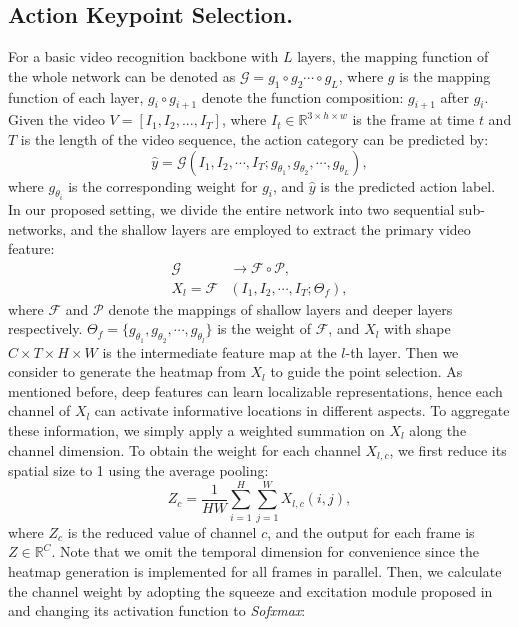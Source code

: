 \documentclass[journal]{IEEEtran}
\begin{document}
\subsection{Action Keypoint Selection.}
For a basic video recognition backbone with $L$ layers, the mapping function of the whole network can be denoted as $\mathcal{G}=g_1\circ g_2 \cdots \circ g_L$, where $g$ is the mapping function of each layer, $g_i\circ g_{i+1}$ denote the function composition: $g_{i+1}$ after $g_i$.
Given the video $V = [I_1, I_2, ..., I_T]$, where $I_t\in \mathbb{R}^{3\times h\times w}$ is the frame at time $t$ and $T$ is the length of the video sequence, the action category can be predicted by:
\begin{equation}
	\hat{y} = \mathcal{G}(I_1,I_2,\cdots,I_T; g_{\theta_1}, g_{\theta_2}, \cdots, g_{\theta_L}),
\end{equation}
where $g_{\theta_i}$ is the corresponding weight for $g_i$, and $\hat{y}$ is the predicted action label.
In our proposed setting, we divide the entire network into two sequential sub-networks, and the shallow layers are employed to extract the primary video feature:
\begin{align}
    \mathcal{G}&\rightarrow\mathcal{F}\circ\mathcal{P}, \\
	X_l = \mathcal{F}&(I_1,I_2,\cdots,I_T; \Theta_f),
\end{align}
where $\mathcal{F}$ and $\mathcal{P}$ denote the mappings of shallow layers and deeper layers respectively.
$\Theta_f=\{g_{\theta_1},g_{\theta_2},\cdots,g_{\theta_l}\}$ is the weight of $\mathcal{F}$, and $X_l$ with shape $C\times T\times H\times W$ is the intermediate feature map at the $l$-th layer.
Then we consider to generate the heatmap from $X_l$ to guide the point selection.
As mentioned before, deep features can learn localizable representations, hence each channel of $X_l$ can activate informative locations in different aspects.
To aggregate these information, we simply apply a weighted summation on $X_l$ along the channel dimension.
To obtain the weight for each channel $X_{l,c}$, we first reduce its spatial size to 1 using the average pooling:
\begin{equation}
    Z_c = \frac{1}{HW}\sum_{i=1}^{H}\sum_{j=1}^{W}X_{l,c}(i,j),
\end{equation}
where $Z_c$ is the reduced value of channel $c$, and the output for each frame is $Z\in \mathbb{R}^{C}$.
Note that we omit the temporal dimension for convenience since the heatmap generation is implemented for all frames in parallel.
Then, we calculate the channel weight by adopting the squeeze and excitation module proposed in \cite{2018senet} and changing its activation function to \textit{Sofxmax}:
\end{document}

